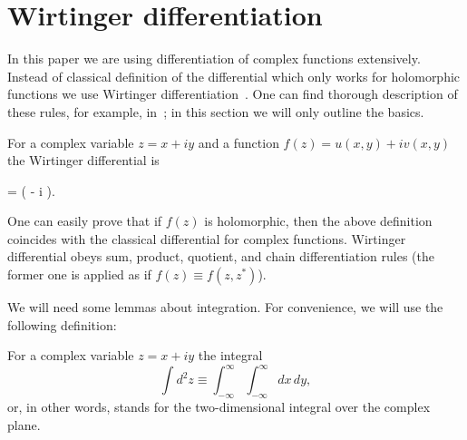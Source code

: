 \section{Wirtinger differentiation}

In this paper we are using differentiation of complex functions extensively.
Instead of classical definition of the differential which only works for holomorphic functions we use Wirtinger differentiation~\cite{Wirtinger1927}.
One can find thorough description of these rules, for example, in~\cite{Kreutz-Delgado2009}; in this section we will only outline the basics.

\begin{definition}
	For a complex variable $z = x + iy$ and a function $f(z) = u(x, y) + iv(x, y)$ the Wirtinger differential is
	\begin{eqn*}
		=  \left(
			 - i 
		\right).
	\end{eqn*}
\end{definition}

One can easily prove that if $f(z)$ is holomorphic, then the above definition coincides with the classical differential for complex functions.
Wirtinger differential obeys sum, product, quotient, and chain differentiation rules (the former one is applied as if $f(z) \equiv f(z, z^*)$).

We will need some lemmas about integration.
For convenience, we will use the following definition:

\begin{definition}
	For a complex variable $z = x + iy$ the integral
	\begin{equation*}
		\int d^2 z \equiv \int_{-\infty}^{\infty} \int_{-\infty}^{\infty} dx\, dy,
	\end{equation*}
	or, in other words, stands for the two-dimensional integral over the complex plane.
\end{definition}

